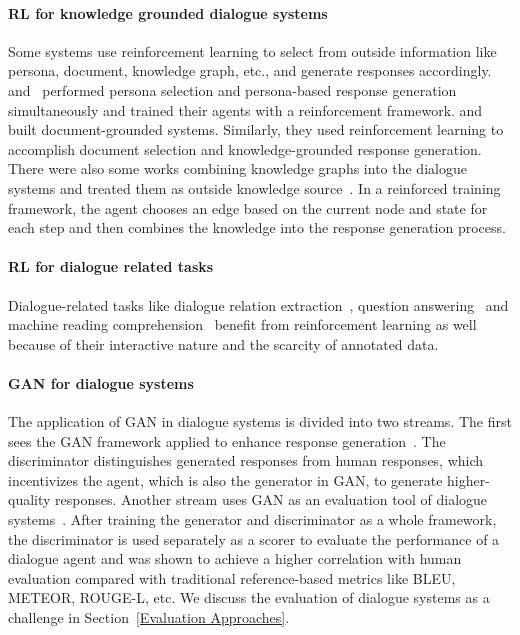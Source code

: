 \paragraph*{RL for knowledge grounded dialogue systems} Some systems use reinforcement learning to select from outside information like persona, document, knowledge graph, etc., and generate responses accordingly.  and~ performed persona selection and persona-based response generation simultaneously and trained their agents with a reinforcement framework.  and~ built document-grounded systems. Similarly, they used reinforcement learning to accomplish document selection and knowledge-grounded response generation. There were also some works combining knowledge graphs into the dialogue systems and treated them as outside knowledge source~. In a reinforced training framework, the agent chooses an edge based on the current node and state for each step and then combines the knowledge into the response generation process. 
\paragraph*{RL for dialogue related tasks} Dialogue-related tasks like dialogue relation extraction~, question answering~ and machine reading comprehension~ benefit from reinforcement learning as well because of their interactive nature and the scarcity of annotated data. 
\paragraph*{GAN for dialogue systems} The application of GAN in dialogue systems is divided into two streams. The first sees the GAN framework applied to enhance response generation~. The discriminator distinguishes generated responses from human responses, which incentivizes the agent, which is also the generator in GAN, to generate higher-quality responses. Another stream uses GAN as an evaluation tool of dialogue systems~. After training the generator and discriminator as a whole framework, the discriminator is used separately as a scorer to evaluate the performance of a dialogue agent and was shown to achieve a higher correlation with human evaluation compared with traditional reference-based metrics like BLEU, METEOR, ROUGE-L, etc. We discuss the evaluation of dialogue systems as a challenge in Section~\ref{Evaluation Approaches}.

